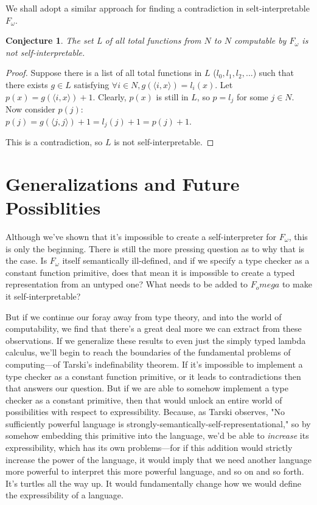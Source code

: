 \documentclass[conference]{IEEEtran}
\newtheorem{conjecture}{Conjecture}
\begin{document}
We shall adopt a similar approach for finding a contradiction in selt-interpretable $F_\omega$.

\begin{conjecture}
The set L of all total functions from $N$ to $N$ computable by $F_\omega$ is not self-interpretable.
\end{conjecture}

\begin{proof}
    Suppose there is a list of all total functions in $L$ ($l_0, l_1, l_2, ...$) such that there exists $g \in L$ satisfying $\forall i \in N, g(\langle i, x\rangle ) = l_i(x)$. Let $p(x) = g(\langle i, x\rangle ) + 1$. Clearly, $p(x)$ is still in $L$, so $p = l_j$ for some $j \in N$. Now consider $p(j)$:\\
    $p(j)=g(\langle j, j\rangle )+1=l_j(j) + 1 = p(j) + 1$.

    This is a contradiction, so $L$ is not self-interpretable.
\end{proof}

\section{Generalizations and Future Possiblities}

Although we've shown that it's impossible to create a self-interpreter for $F_\omega$, this is only the beginning. There is still the more pressing question as to why that is the case. Is $F_\omega$ itself semantically ill-defined, and if we specify a type checker as a constant function primitive, does that mean it is impossible to create a typed representation from an untyped one? What needs to be added to $F_omega$ to make it self-interpretable?

But if we continue our foray away from type theory, and into the world of computability, we find that there's a great deal more we can extract from these observations. If we generalize these results to even just the simply typed lambda calculus, we'll begin to reach the boundaries of the fundamental problems of computing—of Tarski's indefinability theorem. If it's impossible to implement a type checker as a constant function primitive, or it leads to contradictions then that answers our question. But if we are able to somehow implement a type checker as a constant primitive, then that would unlock an entire world of possibilities with respect to expressibility. Because, as Tarski observes, "No sufficiently powerful language is strongly-semantically-self-representational," so by somehow embedding this primitive into the language, we'd be able to \textit{increase} its expressibility, which has its own problems—for if this addition would strictly increase the power of the language, it would imply that we need another language more powerful to interpret this more powerful language, and so on and so forth. It's turtles all the way up. It would fundamentally change how we would define the expressibility of a language.
\end{document}
